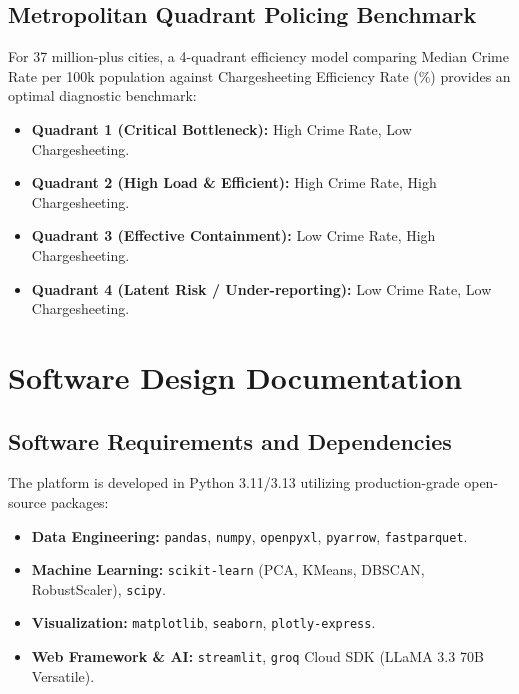 \documentclass[12pt,a4paper]{report}
\begin{document}
\section{Metropolitan Quadrant Policing Benchmark}
For 37 million-plus cities, a 4-quadrant efficiency model comparing Median Crime Rate per 100k population against Chargesheeting Efficiency Rate (\%) provides an optimal diagnostic benchmark:
\begin{itemize}[leftmargin=*]
    \item \textbf{Quadrant 1 (Critical Bottleneck):} High Crime Rate, Low Chargesheeting.
    \item \textbf{Quadrant 2 (High Load \& Efficient):} High Crime Rate, High Chargesheeting.
    \item \textbf{Quadrant 3 (Effective Containment):} Low Crime Rate, High Chargesheeting.
    \item \textbf{Quadrant 4 (Latent Risk / Under-reporting):} Low Crime Rate, Low Chargesheeting.
\end{itemize}

\chapter{Software Design Documentation}

\section{Software Requirements and Dependencies}
The platform is developed in Python 3.11/3.13 utilizing production-grade open-source packages:
\begin{itemize}[leftmargin=*]
    \item \textbf{Data Engineering:} \texttt{pandas}, \texttt{numpy}, \texttt{openpyxl}, \texttt{pyarrow}, \texttt{fastparquet}.
    \item \textbf{Machine Learning:} \texttt{scikit-learn} (PCA, KMeans, DBSCAN, RobustScaler), \texttt{scipy}.
    \item \textbf{Visualization:} \texttt{matplotlib}, \texttt{seaborn}, \texttt{plotly-express}.
    \item \textbf{Web Framework & AI:} \texttt{streamlit}, \texttt{groq} Cloud SDK (LLaMA 3.3 70B Versatile).
\end{itemize}
\end{document}
